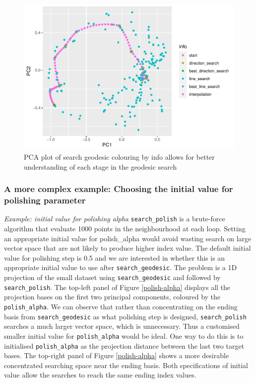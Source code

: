 \documentclass[12pt]{article}
\begin{document}
\begin{figure}
\centering
\includegraphics{paper_files/figure-latex/pca-1.pdf}
\caption{\label{pca}PCA plot of search geodesic colouring by info allows
for better understanding of each stage in the geodesic search}
\end{figure}

\hypertarget{a-more-complex-example-choosing-the-initial-value-for-polishing-parameter}{%
\subsubsection{A more complex example: Choosing the initial value for
polishing
parameter}\label{a-more-complex-example-choosing-the-initial-value-for-polishing-parameter}}

\emph{Example: initial value for polishing alpha}
\texttt{search\_polish} is a brute-force algorithm that evaluate 1000
points in the neighbourhood at each loop. Setting an appropriate initial
value for polish\_alpha would avoid wasting search on large vector space
that are not likely to produce higher index value. The default initial
value for polishing step is 0.5 and we are interested in whether this is
an appropriate initial value to use after \texttt{search\_geodesic}. The
problem is a 1D projection of the small dataset using
\texttt{search\_geodesic} and followed by \texttt{search\_polish}. The
top-left panel of Figure \ref{polish-alpha} displays all the projection
bases on the first two principal components, coloured by the
\texttt{polish\_alpha}. We can observe that rather than concentrating on
the ending basis from \texttt{search\_geodesic} as what polishing step
is designed, \texttt{search\_polish} searches a much larger vector
space, which is unnecessary. Thus a customised smaller initial value for
\texttt{polish\_alpha} would be ideal. One way to do this is to
initialised \texttt{polish\_alpha} as the projection distance between
the last two target bases. The top-right panel of Figure
\ref{polish-alpha} shows a more desirable concentrated searching space
near the ending basis. Both specifications of initial value allow the
searches to reach the same ending index values.
\end{document}
